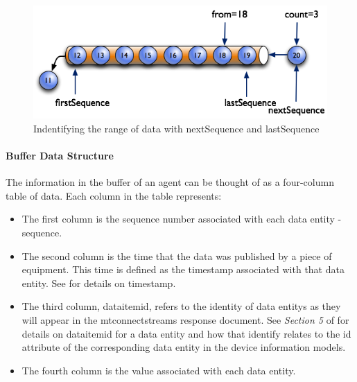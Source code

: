 \documentclass{mtconnect}	%
\begin{document}
\begin{figure}[ht]
  \centering
  \includegraphics[width=1.0\textwidth]{figures/identifying-the-range-of-data-with-nextsequence-and-lastsequence.png}
  \caption{Indentifying the range of data with nextSequence and lastSequence}
  \label{fig:identifying-the-range-of-data-with-nextsequence-and-lastsequence}
\end{figure}

\FloatBarrier

\paragraph{Buffer Data Structure}\mbox{}

The information in the \gls{buffer} of an \gls{agent} can be thought of as a four-column table of data.  Each column in the table represents:

\begin{itemize}
\item The first column is the \gls{sequence number} associated with each \gls{data entity} - \gls{sequence}.

\item The second column is the time that the data was published by a piece of equipment.  This time is defined as the \gls{timestamp} associated with that \gls{data entity}.  See  for details on \gls{timestamp}.

\item The third column, \gls{dataitemid}, refers to the identity of \glspl{data entity} as they will appear in the \gls{mtconnectstreams response document}.  See \textit{Section 5} of  for details on \gls{dataitemid} for a \gls{data entity} and how that identify relates to the \gls{id} attribute of the corresponding \gls{data entity} in the \glspl{device information model}.

\item The fourth column is the value associated with each \gls{data entity}.
\end{itemize}
\end{document}
